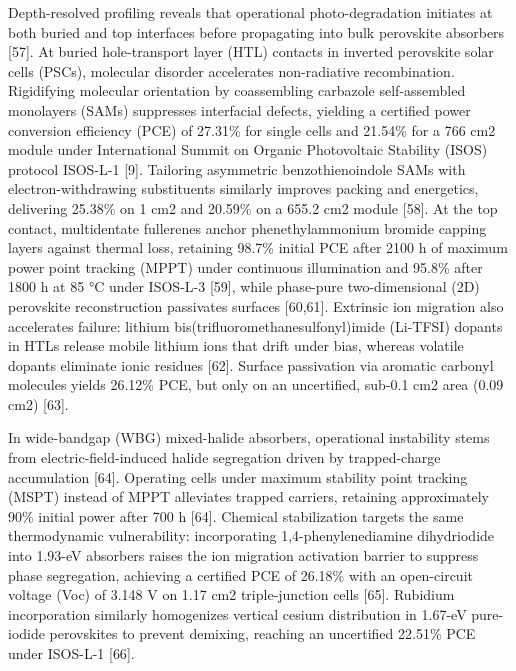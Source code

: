 \documentclass[
  11pt,
]{article}
\begin{document}
Depth-resolved profiling reveals that operational photo-degradation
initiates at both buried and top interfaces before propagating into bulk
perovskite absorbers {[}57{]}. At buried hole-transport layer (HTL)
contacts in inverted perovskite solar cells (PSCs), molecular disorder
accelerates non-radiative recombination. Rigidifying molecular
orientation by coassembling carbazole self-assembled monolayers (SAMs)
suppresses interfacial defects, yielding a certified power conversion
efficiency (PCE) of 27.31\% for single cells and 21.54\% for a 766 cm2
module under International Summit on Organic Photovoltaic Stability
(ISOS) protocol ISOS-L-1 {[}9{]}. Tailoring asymmetric benzothienoindole
SAMs with electron-withdrawing substituents similarly improves packing
and energetics, delivering 25.38\% on 1 cm2 and 20.59\% on a 655.2 cm2
module {[}58{]}. At the top contact, multidentate fullerenes anchor
phenethylammonium bromide capping layers against thermal loss, retaining
98.7\% initial PCE after 2100 h of maximum power point tracking (MPPT)
under continuous illumination and 95.8\% after 1800 h at 85 °C under
ISOS-L-3 {[}59{]}, while phase-pure two-dimensional (2D) perovskite
reconstruction passivates surfaces {[}60,61{]}. Extrinsic ion migration
also accelerates failure: lithium bis(trifluoromethanesulfonyl)imide
(Li-TFSI) dopants in HTLs release mobile lithium ions that drift under
bias, whereas volatile dopants eliminate ionic residues {[}62{]}.
Surface passivation via aromatic carbonyl molecules yields 26.12\% PCE,
but only on an uncertified, sub-0.1 cm2 area (0.09 cm2) {[}63{]}.

In wide-bandgap (WBG) mixed-halide absorbers, operational instability
stems from electric-field-induced halide segregation driven by
trapped-charge accumulation {[}64{]}. Operating cells under maximum
stability point tracking (MSPT) instead of MPPT alleviates trapped
carriers, retaining approximately 90\% initial power after 700 h
{[}64{]}. Chemical stabilization targets the same thermodynamic
vulnerability: incorporating 1,4-phenylenediamine dihydriodide into
1.93-eV absorbers raises the ion migration activation barrier to
suppress phase segregation, achieving a certified PCE of 26.18\% with an
open-circuit voltage (Voc) of 3.148 V on 1.17 cm2 triple-junction cells
{[}65{]}. Rubidium incorporation similarly homogenizes vertical cesium
distribution in 1.67-eV pure-iodide perovskites to prevent demixing,
reaching an uncertified 22.51\% PCE under ISOS-L-1 {[}66{]}.
\end{document}
